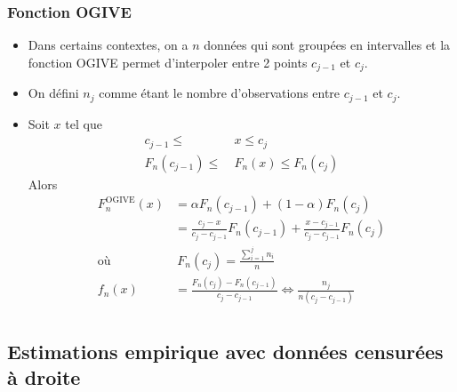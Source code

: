 \documentclass[french, landscape]{article}
\begin{document}
\begin{multicols*}{3}
\subsubsection*{Fonction OGIVE}
\begin{itemize}
    \item Dans certains contextes, on a $n$ données qui sont groupées en intervalles et la fonction OGIVE permet d'interpoler entre 2 points $c_{j - 1}$ et $c_j$.
    \item On défini $n_j$ comme étant le nombre d'observations entre $c_{j - 1}$ et $c_{j}$.
    \item Soit $x$ tel que
    \begin{align*}
    		c_{j - 1} \le &\ x \le c_j \\
    		F_{n	}(c_{j - 1}) \le &\ F_{n}(x) \le F_{n}(c_{j}) 
    \end{align*}
    Alors 
    \begin{align*}
		F_{n}^{\text{OGIVE}}(x) &= \alpha F_{n}(c_{j - 1}) + (1 - \alpha) F_{n}(c_{j}) \\
		&= \frac{c_{j} - x}{c_{j} - c_{j - 1}} F_{n}(c_{j - 1}) + \frac{x - c_{j - 1}}{c_{j} - c_{j - 1}} F_{n}(c_{j}) \\
       	\text{où } &\ F_{n}(c_j) = \frac{\sum_{i = 1}^{j} n_{i}}{n} \\
       	f_n(x) &= \frac{F_{n}(c_{j}) - F_{n}(c_{j - 1})}{c_{j} - c_{j - 1}} \Leftrightarrow \frac{n_j}{n(c_{j} - c_{j - 1})} \\
    \end{align*}
\end{itemize}

\subsection*{Estimations empirique avec données censurées à droite}


\end{multicols*}
\end{document}
